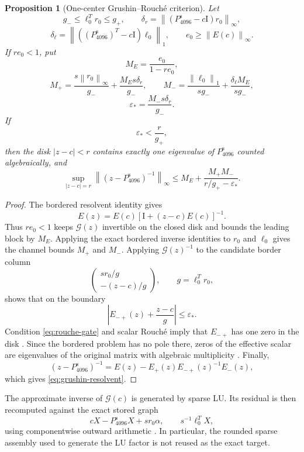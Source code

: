 \documentclass[11pt]{article}
\newtheorem{proposition}[theorem]{Proposition}
\theoremstyle{definition}
\theoremstyle{remark}
\newcommand{\Id}{\mathrm I}
\newcommand{\cG}{\mathcal G}
\newcommand{\norm}[1]{\left\lVert #1\right\rVert}
\begin{document}
\begin{proposition}[One-center Grushin--Rouch\'e criterion]
\label{prop:grushin}
Let
\[
 g_- \le \ell_0^Tr_0\le g_+,\qquad
 \delta_r=\norm{(P^{\mathrm s}_{4096}-c\Id)r_0}_\infty,
\]
\[
 \delta_\ell=
 \norm{((P^{\mathrm s}_{4096})^T-c\Id)\ell_0}_1,
\qquad
 e_0\ge\norm{E(c)}_\infty.
\]
If $re_0<1$, put
\[
 M_E=\frac{e_0}{1-re_0},
\]
\[
 M_+=\frac{s\norm{r_0}_\infty}{g_-}
      +\frac{M_Es\delta_r}{g_-},
\qquad
 M_-=\frac{\norm{\ell_0}_1}{sg_-}
      +\frac{\delta_\ell M_E}{sg_-},
\]
\[
 \varepsilon_*=\frac{M_-s\delta_r}{g_-}.
\]
If
\[
 \varepsilon_*<\frac r{g_+},
 \label{eq:rouche-gate}
\]
then the disk $|z-c|<r$ contains exactly one eigenvalue of
$P^{\mathrm s}_{4096}$ counted algebraically, and
\begin{equation}
 \sup_{|z-c|=r}\norm{(z-P^{\mathrm s}_{4096})^{-1}}_\infty
 \le
 M_E+\frac{M_+M_-}{r/g_+-\varepsilon_*}.
 \label{eq:grushin-resolvent}
\end{equation}
\end{proposition}

\begin{proof}
The bordered resolvent identity gives
\[
 E(z)=E(c)[\Id+(z-c)E(c)]^{-1}.
\]
Thus $re_0<1$ keeps $\cG(z)$ invertible on the closed disk and bounds the
leading block by $M_E$.  Applying the exact bordered inverse identities to
$r_0$ and $\ell_0$ gives the channel bounds $M_+$ and $M_-$.  Applying
$\cG(z)^{-1}$ to the candidate border column
\[
 \begin{pmatrix}
 sr_0/g\\-(z-c)/g
 \end{pmatrix},
 \qquad g=\ell_0^Tr_0,
\]
shows that on the boundary
\[
 \left|E_{-+}(z)+\frac{z-c}{g}\right|
 \le\varepsilon_*.
\]
Condition \eqref{eq:rouche-gate} and scalar Rouch\'e imply that
$E_{-+}$ has one zero in the disk \citep{Ahlfors1979}.  Since the bordered
problem has no pole there, zeros of the effective scalar are eigenvalues of
the original matrix with algebraic multiplicity
\citep{SjoestrandZworski2007,GohbergSigal1971}.  Finally,
\[
 (z-P^{\mathrm s}_{4096})^{-1}
 =E(z)-E_+(z)E_{-+}(z)^{-1}E_-(z),
\]
which gives \eqref{eq:grushin-resolvent}.
\end{proof}

The approximate inverse of $\cG(c)$ is generated by sparse LU.  Its
residual is then recomputed against the exact stored graph
\[
 cX-P^{\mathrm s}_{4096}X+s r_0\alpha,
 \qquad
 s^{-1}\ell_0^TX,
\]
using componentwise outward arithmetic
\citep{Rump2010,WangOutward2026}.  In particular, the rounded sparse assembly used
to generate the LU factor is not reused as the exact target.
\end{document}
